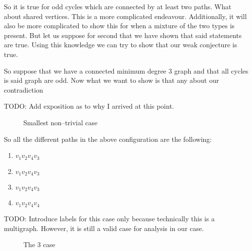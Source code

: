 \documentclass[12pt]{article}
\theoremstyle{plain}
\begin{document}
So it is true for odd cycles which are connected by at least two
paths. What about shared vertices. This is a more complicated
endeavour. Additionally, it will also be more complicated to
show this for when a mixture of the two types is present. But
let us suppose for second that we have shown that said
statements are true. Using this knowledge we can try to show
that our weak conjecture is true.

So suppose that we have a connected minimum degree 3 graph and
that all cycles is said graph are odd. Now what we want to show
is that any 
about our contradiction 

TODO: Add exposition as to why I arrived at this point.

\begin{figure}[H]
\centering
{}
\caption{Smallest non--trivial case}
\end{figure}

So all the different paths in the above configuration are the
following:

\begin{enumerate}
\item $v_1 v_2 v_4 v_3$
\item $v_1 v_2 v_4 v_3$
\item $v_1 v_2 v_4 v_3$
\item $v_1 v_2 v_4 v_4$
\end{enumerate}

TODO: Introduce labels for this case only because technically
this is a multigraph. However, it is still a valid case for
analysis in our case.

\begin{figure}[H]
\centering
{}
\caption{The 3 case}
\end{figure}
\end{document}
